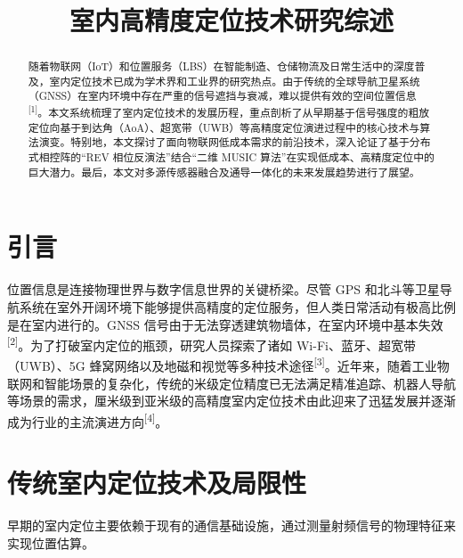 \documentclass[UTF8,a4paper,12pt]{ctexart}
\newcommand{\refmark}[1]{\textsuperscript{[#1]}}
\begin{document}
\title{室内高精度定位技术研究综述}
\author{}
\date{}
\maketitle
\vspace{-3em}
\begin{abstract}
随着物联网（IoT）和位置服务（LBS）在智能制造、仓储物流及日常生活中的深度普及，室内定位技术已成为学术界和工业界的研究热点。由于传统的全球导航卫星系统（GNSS）在室内环境中存在严重的信号遮挡与衰减，难以提供有效的空间位置信息\refmark{1}。本文系统梳理了室内定位技术的发展历程，重点剖析了从早期基于信号强度的粗放定位向基于到达角（AoA）、超宽带（UWB）等高精度定位演进过程中的核心技术与算法演变。特别地，本文探讨了面向物联网低成本需求的前沿技术，深入论证了基于分布式相控阵的“REV 相位反演法”结合“二维 MUSIC 算法”在实现低成本、高精度定位中的巨大潜力。最后，本文对多源传感器融合及通导一体化的未来发展趋势进行了展望。
\end{abstract}

\section{引言}
位置信息是连接物理世界与数字信息世界的关键桥梁。尽管 GPS 和北斗等卫星导航系统在室外开阔环境下能够提供高精度的定位服务，但人类日常活动有极高比例是在室内进行的。GNSS 信号由于无法穿透建筑物墙体，在室内环境中基本失效\refmark{2}。为了打破室内定位的瓶颈，研究人员探索了诸如 Wi-Fi、蓝牙、超宽带（UWB）、5G 蜂窝网络以及地磁和视觉等多种技术途径\refmark{3}。近年来，随着工业物联网和智能场景的复杂化，传统的米级定位精度已无法满足精准追踪、机器人导航等场景的需求，厘米级到亚米级的高精度室内定位技术由此迎来了迅猛发展并逐渐成为行业的主流演进方向\refmark{4}。

\section{传统室内定位技术及局限性}
早期的室内定位主要依赖于现有的通信基础设施，通过测量射频信号的物理特征来实现位置估算。
\end{document}
